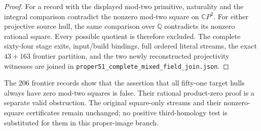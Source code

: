 \begin{proof}
For a record with the displayed mod-two primitive, naturality and
the integral comparison contradict the nonzero mod-two square on
$\mathbb CP^2$.  For either projective source hull, the same
comparison over $\mathbb Q$ contradicts its nonzero rational square.
Every possible quotient is therefore excluded.  The complete
sixty-four stage exits, input/build bindings, full ordered literal
streams, the exact $43+163$ frontier partition, and the two newly
reconstructed projectivity witnesses are joined in
\texttt{proper51\_complete\_mixed\_field\_join.json}.
\end{proof}

\begin{remark*}
The $206$ frontier records show that the assertion that all
fifty-one target hulls always have zero mod-two squares is false.
Their rational product-zero proof is a separate valid obstruction.
The original square-only streams and their nonzero-square
certificates remain unchanged; no positive third-homology test is
substituted for them in this proper-image branch.
\end{remark*}
